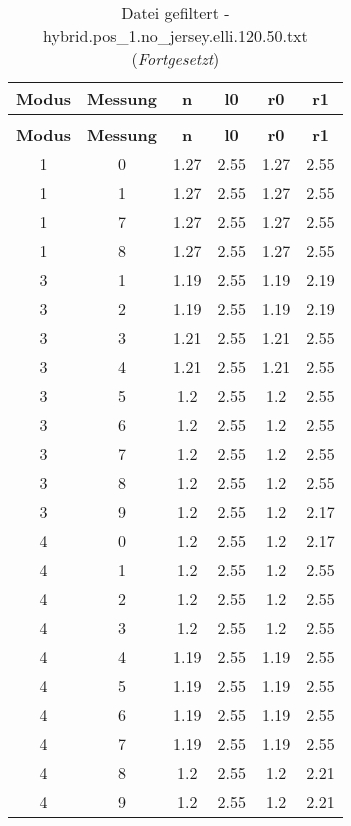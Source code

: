 \begin{longtable}{|c|c||c||c||c|c|}
	\caption{Datei gefiltert - hybrid.pos\_1.no\_jersey.elli.120.50.txt} \label{tab:hybrid.pos-1.no-jersey.elli.120.50.txt} \\ \hline
	\textbf{Modus} & \textbf{Messung} & \textbf{n} & \textbf{l0} & \textbf{r0} & \textbf{r1}\\ \hline
	\endfirsthead
	\caption[]{Datei gefiltert - hybrid.pos\_1.no\_jersey.elli.120.50.txt (\emph{Fortgesetzt})} \\ \hline
	\textbf{Modus} & \textbf{Messung} & \textbf{n} & \textbf{l0} & \textbf{r0} & \textbf{r1}\\ \hline
	\endhead
	1 & 0 & 1.27 & 2.55 & 1.27 & 2.55 \\ \hline
	1 & 1 & 1.27 & 2.55 & 1.27 & 2.55 \\ \hline
	1 & 7 & 1.27 & 2.55 & 1.27 & 2.55 \\ \hline
	1 & 8 & 1.27 & 2.55 & 1.27 & 2.55 \\ \hline
	3 & 1 & 1.19 & 2.55 & 1.19 & 2.19 \\ \hline
	3 & 2 & 1.19 & 2.55 & 1.19 & 2.19 \\ \hline
	3 & 3 & 1.21 & 2.55 & 1.21 & 2.55 \\ \hline
	3 & 4 & 1.21 & 2.55 & 1.21 & 2.55 \\ \hline
	3 & 5 & 1.2 & 2.55 & 1.2 & 2.55 \\ \hline
	3 & 6 & 1.2 & 2.55 & 1.2 & 2.55 \\ \hline
	3 & 7 & 1.2 & 2.55 & 1.2 & 2.55 \\ \hline
	3 & 8 & 1.2 & 2.55 & 1.2 & 2.55 \\ \hline
	3 & 9 & 1.2 & 2.55 & 1.2 & 2.17 \\ \hline
	4 & 0 & 1.2 & 2.55 & 1.2 & 2.17 \\ \hline
	4 & 1 & 1.2 & 2.55 & 1.2 & 2.55 \\ \hline
	4 & 2 & 1.2 & 2.55 & 1.2 & 2.55 \\ \hline
	4 & 3 & 1.2 & 2.55 & 1.2 & 2.55 \\ \hline
	4 & 4 & 1.19 & 2.55 & 1.19 & 2.55 \\ \hline
	4 & 5 & 1.19 & 2.55 & 1.19 & 2.55 \\ \hline
	4 & 6 & 1.19 & 2.55 & 1.19 & 2.55 \\ \hline
	4 & 7 & 1.19 & 2.55 & 1.19 & 2.55 \\ \hline
	4 & 8 & 1.2 & 2.55 & 1.2 & 2.21 \\ \hline
	4 & 9 & 1.2 & 2.55 & 1.2 & 2.21 \\ \hline

\end{longtable}
